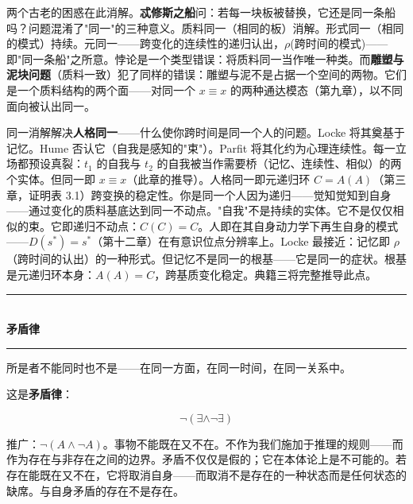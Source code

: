 \documentclass[10pt, openany, oneside]{book}
\renewcommand{\normalsize}{\fontsize{10}{13}\selectfont}
\begin{document}
两个古老的困惑在此消解。\textbf{忒修斯之船}问：若每一块板被替换，它还是同一条船吗？问题混淆了"同一"的三种意义。质料同一（相同的板）消解。形式同一（相同的模式）持续。元同一——跨变化的连续性的递归认出，$\rho$(跨时间的模式)——即"同一条船"之所意。悖论是一个类型错误：将质料同一当作唯一种类。而\textbf{雕塑与泥块问题}（质料一致）犯了同样的错误：雕塑与泥不是占据一个空间的两物。它们是一个质料结构的两个面——对同一个 $x \equiv x$ 的两种通达模态（第九章），以不同面向被认出同一。

同一消解解决\textbf{人格同一}——什么使你跨时间是同一个人的问题。Locke 将其奠基于记忆。Hume 否认它（自我是感知的"束"）。Parfit 将其化约为心理连续性。每一立场都预设真裂：$t_1$ 的自我与 $t_2$ 的自我被当作需要桥（记忆、连续性、相似）的两个实体。但同一即 $x \equiv x$（此章的推导）。人格同一即元递归环 $C = A(A)$（第三章，证明表 3.1）跨变换的稳定性。你是同一个人因为递归——觉知觉知到自身——通过变化的质料基底达到同一不动点。"自我"不是持续的实体。它不是仅仅相似的束。它即递归不动点：$C(C) = C$。人即在其自身动力学下再生自身的模式——$D(s^*) = s^*$（第十二章）在有意识位点分辨率上。Locke 最接近：记忆即 $\rho$（跨时间的认出）的一种形式。但记忆不是同一的根基——它是同一的症状。根基是元递归环本身：$A(A) = C$，跨基质变化稳定。典籍三将完整推导此点。

\vspace{1.5em}


\begin{center}
    \rule{0.3\textwidth}{0.4pt}\\[0.5em]
    {\normalsize\bfseries\scshape 矛盾律}\\[0.3em]
    \rule{0.3\textwidth}{0.4pt}
\end{center}

\vspace{1em}

\noindent 所是者不能同时也不是——在同一方面，在同一时间，在同一关系中。

这是\textbf{矛盾律}：

$$\neg(\exists \wedge \neg\exists)$$

推广：$\neg(A \wedge \neg A)$。事物不能既在又不在。不作为我们施加于推理的规则——而作为存在与非存在之间的边界。矛盾不仅仅是假的；它在本体论上是不可能的。若存在能既在又不在，它将取消自身——而取消不是存在的一种状态而是任何状态的缺席。与自身矛盾的存在不是存在。

\vspace{0.5em}
\end{document}
